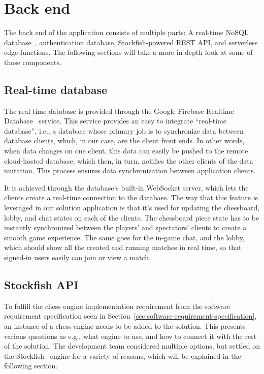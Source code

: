 \section{Back end}\label{sec:backend}

The back end of the application consists of multiple parts: A real-time NoSQL database~\cite{nosql}, authentication
database, Stockfish-powered REST API, and serverless edge-functions.
The following sections will take a more in-depth look at some of those components.

\subsection{Real-time database}\label{subsec:real-time-database}

The real-time database is provided through the Google Firebase Realtime Database~\cite{realtime-database} service.
This service provides an easy to integrate ``real-time database'', i.e., a database whose primary job is to synchronize
data between database clients, which, in our case, are the client front ends.
In other words, when data changes on one client, this data can easily be pushed to the remote cloud-hosted database,
which then, in turn, notifies the other clients of the data mutation.
This process ensures data synchronization between application clients.

It is achieved through the database's built-in WebSocket server, which lets the clients create a real-time connection
to the database.
The way that this feature is leveraged in our solution application is that it's used for updating the chessboard, lobby,
and chat states on each of the clients.
The chessboard piece state has to be instantly synchronized between the players' and spectators'
clients to create a smooth game experience.
The same goes for the in-game chat, and the lobby, which should show all the created and running matches in real time,
so that signed-in users easily can join or view a match.

\subsection{Stockfish API}\label{subsec:stockfish-api}

To fulfill the chess engine implementation requirement from the software requirement specification seen in
Section~\ref{sec:software-requirement-specification}, an instance of a chess engine needs to be added to the solution.
This presents various questions as e.g., what engine to use, and how to connect it with the rest of the solution.
The development team considered multiple options,
but settled on the Stockfish~\cite{stockfish} engine for a variety of reasons, which will be explained in the following
section.

